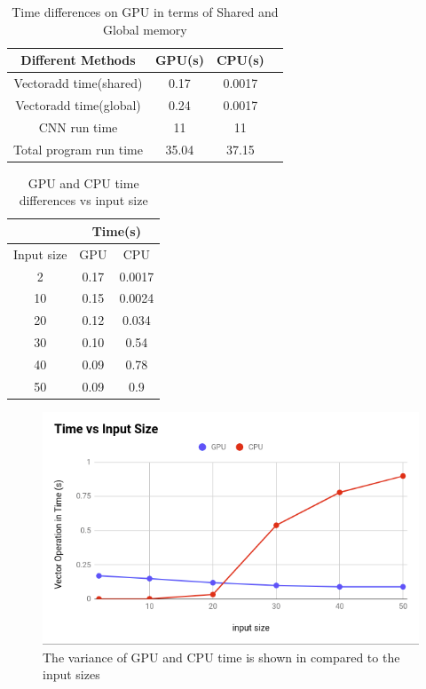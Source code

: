 \documentclass[11pt]{article}       %
\begin{document}
\begin{table}[h]
  \centering
  \caption{Time differences on GPU in terms of Shared and Global memory} \label{memorytable}   
    	\begin{tabular}{|c|c|c|c|}
        	\hline
        	Different Methods & GPU(s) & CPU(s)\\
        	\hline
        	Vectoradd time(shared) & 0.17 & 0.0017 \\
        	\hline
       		Vectoradd time(global) & 0.24 & 0.0017 \\
        	\hline
        	CNN run time & 11 & 11 \\
        	\hline
        	Total program run time & 35.04 & 37.15 \\
        	\hline
    	\end{tabular}
\end{table}
\begin{table}[h]
\centering
  \caption{GPU and CPU time differences vs input size} \label{input-time}
  \begin{tabular}{c|c|c|}
        	\cline{2-3}
             & \multicolumn{2}{|c|}{Time(s)}\\
        	\hline
        	\multicolumn{1}{|c|}{Input size} & GPU & CPU \\
        	\hline
        	\multicolumn{1}{|c|}{2} & 0.17 & 0.0017 \\
        	\hline
        	\multicolumn{1}{|c|}{10} & 0.15 & 0.0024 \\
        	\hline
        	\multicolumn{1}{|c|}{20} & 0.12 & 0.034 \\
        	\hline
        	\multicolumn{1}{|c|}{30} & 0.10 & 0.54 \\
        	\hline
        	\multicolumn{1}{|c|}{40} & 0.09 &	0.78 \\
        	\hline
        	\multicolumn{1}{|c|}{50} & 0.09 & 0.9 \\
        	\hline
    \end{tabular}
\end{table}

\begin{figure}[h]
\begin{center}
\includegraphics[scale=0.5]{chart-para.png} 
\caption{The variance of GPU and CPU time is shown in compared to the input sizes}\label{analysis}
\end{center}
\end{figure}
\end{document}
